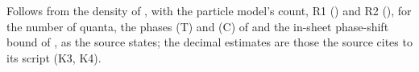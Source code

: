 Follows from the density of , with the particle model's count, R1 () and R2 (), for the number of quanta, the phases (T) and (C) of  and the in-sheet phase-shift bound of , as the source states; the decimal estimates are those the source cites to its script (K3, K4).
